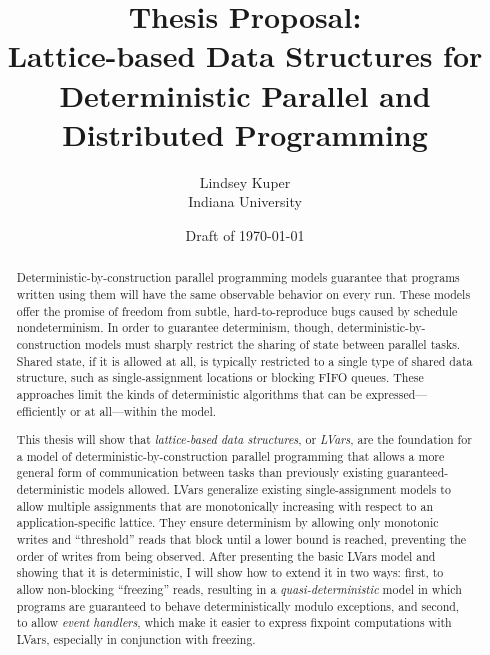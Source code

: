 \documentclass{article}
\begin{document}
\title{Thesis Proposal: \\
  Lattice-based Data Structures for \\
  Deterministic Parallel and Distributed Programming}

\author{Lindsey Kuper \\ Indiana University}

\date{Draft of \today}

\maketitle

\begin{abstract}
  Deterministic-by-construction parallel programming models guarantee
  that programs written using them will have the same observable
  behavior on every run.  These models offer the promise of freedom
  from subtle, hard-to-reproduce bugs caused by schedule
  nondeterminism.  In order to guarantee determinism, though,
  deterministic-by-construction models must sharply restrict the
  sharing of state between parallel tasks.  Shared state, if it is
  allowed at all, is typically restricted to a single type of shared
  data structure, such as single-assignment locations or blocking FIFO
  queues.  These approaches limit the kinds of deterministic
  algorithms that can be expressed---efficiently or at all---within
  the model.

  This thesis will show that \emph{lattice-based data structures}, or
  \emph{LVars}, are the foundation for a model of
  deterministic-by-construction parallel programming that allows a
  more general form of communication between tasks than previously
  existing guaranteed-deterministic models allowed.  LVars generalize
  existing single-assignment models to allow multiple assignments that
  are monotonically increasing with respect to an application-specific
  lattice.  They ensure determinism by allowing only monotonic writes
  and ``threshold'' reads that block until a lower bound is reached,
  preventing the order of writes from being observed.  After
  presenting the basic LVars model and showing that it is
  deterministic, I will show how to extend it in two ways: first, to
  allow non-blocking ``freezing'' reads, resulting in a
  \emph{quasi-deterministic} model in which programs are guaranteed to
  behave deterministically modulo exceptions, and second, to allow
  \emph{event handlers}, which make it easier to express fixpoint
  computations with LVars, especially in conjunction with freezing.


\end{abstract}
\end{document}
